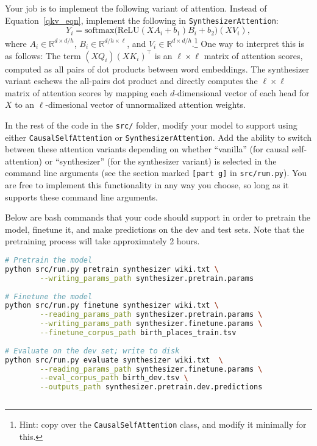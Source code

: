 \begin{parts}
    Your job is to implement the following variant of attention. Instead of Equation~\ref{qkv_eqn}, implement the following in \texttt{SynthesizerAttention}:
    \begin{equation}
        Y_i = \text{softmax}\big(\text{ReLU}(XA_i+b_1)B_i + b_2 \big)(XV_i),
    \end{equation}
    where $A_i\in\mathbb{R}^{d \times d/h}$, $B_i\in\mathbb{R}^{d/h\times \ell}$, and $V_i\in\mathbb{R}^{d\times d/h}$.\footnote{Hint: copy over the \texttt{CausalSelfAttention} class, and modify it minimally for this.}
    One way to interpret this is as follows: The term $(XQ_i)(XK_i)^\top$ is an $\ell \times \ell$ matrix of attention scores, computed as all pairs of dot products between word embeddings.
    The synthesizer variant eschews the all-pairs dot product and directly computes the $\ell \times \ell$ matrix of attention scores by mapping each $d$-dimensional vector of each head for $X$ to an $\ell$-dimesional vector of unnormalized attention weights.

    In the rest of the code in the \texttt{src/} folder, modify your model to support using either \texttt{CausalSelfAttention} or \texttt{SynthesizerAttention}. Add the ability to switch between these attention variants depending on whether ``vanilla'' (for causal self-attention) or ``synthesizer'' (for the synthesizer variant) is selected in the command line arguments (see the section marked \texttt{[part g]} in \texttt{src/run.py}).
    You are free to implement this functionality in any way you choose, so long as it supports these command line arguments.

    Below are bash commands that your code should support in order to pretrain the model, finetune it, and make predictions on the dev and test sets.
    Note that the pretraining process will take approximately 2 hours.
    \begin{lstlisting}[basicstyle=\ttfamily, language=bash]
# Pretrain the model
python src/run.py pretrain synthesizer wiki.txt \
        --writing_params_path synthesizer.pretrain.params
        
# Finetune the model
python src/run.py finetune synthesizer wiki.txt \
        --reading_params_path synthesizer.pretrain.params \
        --writing_params_path synthesizer.finetune.params \
        --finetune_corpus_path birth_places_train.tsv
        
# Evaluate on the dev set; write to disk
python src/run.py evaluate synthesizer wiki.txt  \
        --reading_params_path synthesizer.finetune.params \
        --eval_corpus_path birth_dev.tsv \
        --outputs_path synthesizer.pretrain.dev.predictions
        

\end{lstlisting}
\end{parts}
